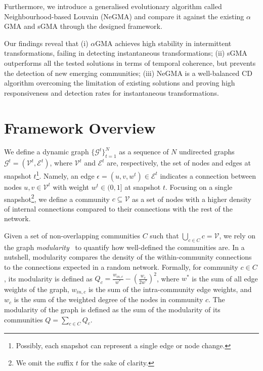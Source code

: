 \documentclass[letterpaper]{article}
\begin{document}
Furthermore, we introduce a generalised evolutionary algorithm called Neighbourhood-based Louvain (NeGMA) and compare it against the existing $\alpha$GMA and sGMA through the designed framework.

Our findings reveal that (i) $\alpha$GMA achieves high stability in intermittent transformations, failing in detecting instantaneous transformations; (ii) sGMA outperforms all the tested solutions in terms of temporal coherence, but prevents the detection of new emerging communities; (iii) NeGMA is a well-balanced CD algorithm overcoming the limitation of existing solutions and proving high responsiveness and detection rates for instantaneous transformations.

\section{Framework Overview}
\label{s:framework}

We define a dynamic graph $\{ \mathcal{G}^t \}_{t=1}^N$ as a sequence of $N$ undirected graphs $\mathcal{G}^t=(\mathcal{V}^t,\mathcal{E}^t)$, where $\mathcal{V}^t$ and $\mathcal{E}^t$ are, respectively, the set of nodes and edges at snapshot $t$\footnote{Possibly, each snapshot can represent a single edge or node change.}.
Namely, an edge $\epsilon = (u,v,w^t)\in \mathcal{E}^t$ indicates a connection between nodes $u,v \in \mathcal{V}^t$ with weight $w^t \in \mathbb (0,1]$ at snapshot $t$.
Focusing on a single snapshot\footnote{We omit the suffix $t$ for the sake of clarity.}, we define a community $c \subseteq \mathcal{V}$ as a set of nodes with a higher density of internal connections compared to their connections with the rest of the network.

Given a set of non-overlapping communities $C$ such that $\bigcup_{c \in C} c = \mathcal{V}$, we rely on the graph \emph{modularity}~\cite{newman2006modularity} to quantify how well-defined the communities are. In a nutshell, modularity compares the density of the within-community connections to the connections expected in a random network.
Formally, for community $c\in C$, its modularity is defined as $Q_c = \frac{w_{in, c}}{w^*} - \left(\frac{w_c}{2w^*}\right)^2$, where $w^*$ is the sum of all edge weights of the graph, $w_{in, c}$ is the sum of the intra-community edge weights, and $w_c$ is the sum of the weighted degree of the nodes in community $c$. The modularity of the graph is defined as the sum of the modularity of its communities $Q = \sum_{c \in C} Q_c$.
\end{document}
